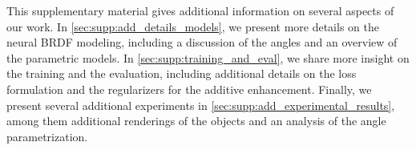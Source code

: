 
This supplementary material gives additional information on several aspects of our work. In \cref{sec:supp:add_details_models}, we present more details on the neural BRDF modeling, including a discussion of the angles and an overview of the parametric models. In \cref{sec:supp:training_and_eval}, we share more insight on the training and the evaluation, including additional details on the loss formulation and the regularizers for the additive enhancement. Finally, we present several additional experiments in \cref{sec:supp:add_experimental_results}, among them additional renderings of the objects and an analysis of the angle parametrization.